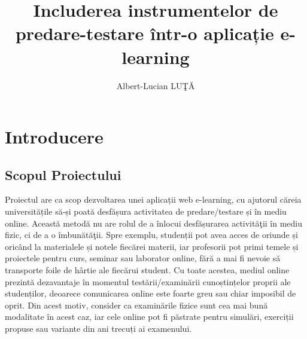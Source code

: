 \documentclass[12pt, a4paper, oneside, romanian]{teza-upb}
\begin{document}
\author{Albert-Lucian LUŢĂ}

\title{Includerea instrumentelor de predare-testare într-o aplicație e-learning}



\beforepreface
\newpage
\listoffigures
{}
\afterpreface 

\null
\chapter*{Introducere}

\section{Scopul Proiectului}

Proiectul are ca scop dezvoltarea unei aplicații web e-learning, cu ajutorul căreia universitățile să-și poată desfășura activitatea de predare/testare și în mediu online. Această metodă nu are rolul de a înlocui desfășurarea activităţii în mediu fizic, ci de a o îmbunătăţii. Spre exemplu, studenții pot avea acces de oriunde și oricând la materialele și notele fiecărei materii, iar profesorii pot primi temele și proiectele pentru curs, seminar sau laborator online, fără a  mai fi nevoie să transporte foile de hârtie ale fiecărui student. Cu toate acestea, mediul online prezintă dezavantaje în momentul testării/examinării cunoștințelor proprii ale studenților, deoarece comunicarea online este foarte greu sau chiar imposibil de oprit. Din acest motiv, consider ca examinările fizice sunt cea mai bună modalitate în acest caz, iar cele online pot fi păstrate pentru simulări, exerciții propuse sau variante din ani trecuți ai examenului.
\end{document}
